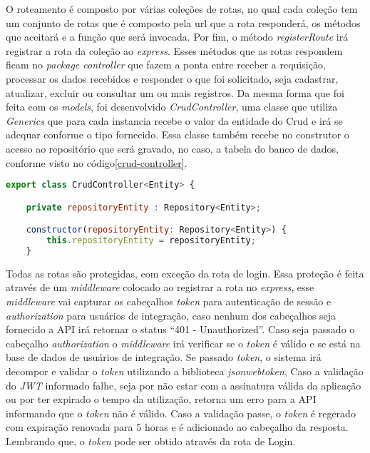 O roteamento é composto por várias coleções de rotas, no qual cada coleção tem um conjunto de rotas que é composto pela url que a rota responderá, os métodos que aceitará e a função que será invocada.
Por fim, o método \textit{registerRoute} irá registrar a rota da coleção ao \textit{express}.
Esses métodos que as rotas respondem ficam no \textit{package controller} que fazem a ponta entre receber a requisição, processar os dados recebidos e responder o que foi solicitado, seja cadastrar, atualizar, excluir ou consultar um ou mais registros.
Da mesma forma que foi feita com os \textit{models}, foi desenvolvido \textit{CrudController}, uma classe que utiliza \textit{Generics} que para cada instancia recebe o valor da entidade do Crud e irá se adequar conforme o tipo fornecido. Essa classe também recebe no construtor o acesso ao repositório que será gravado, no caso, a tabela do banco de dados, conforme visto no código\ref{crud-controller}.

\begin{lstlisting}[language=JavaScript, caption={CrudController}, label={crud-controller}]
export class CrudController<Entity> {

	private repositoryEntity : Repository<Entity>;

	constructor(repositoryEntity: Repository<Entity>) {
		this.repositoryEntity = repositoryEntity;
	}
\end{lstlisting}

Todas as rotas são protegidas, com exceção da rota de login. Essa proteção é feita através de um \textit{middleware} colocado ao registrar a rota no \textit{express}, esse \textit{middleware} vai capturar os cabeçalhos \textit{token} para autenticação de sessão e \textit{authorization} para usuários de integração, caso nenhum dos cabeçalhos seja fornecido a API irá retornar o status ``401 - Unauthorized''. Caso seja passado o cabeçalho \textit{authorization} o \textit{middleware} irá verificar se o \textit{token} é válido e se está na base de dados de usuários de integração. Se passado \textit{token}, o sistema irá decompor e validar o \textit{token} utilizando a biblioteca \textit{jsonwebtoken}, Caso a validação do \textit{JWT} informado falhe, seja por não estar com a assinatura válida da aplicação ou por ter expirado o tempo da utilização, retorna um erro para a API informando que o \textit{token} não é válido. Caso a validação passe, o \textit{token} é regerado com expiração renovada para 5 horas e é adicionado ao cabeçalho da resposta. Lembrando que, o \textit{token} pode ser obtido através da rota de Login.

